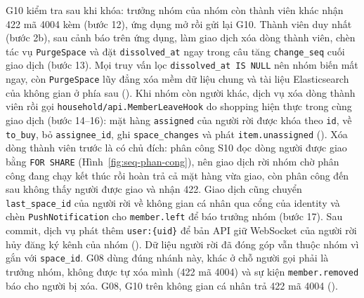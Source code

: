G10 kiểm tra  sau khi khóa: trưởng nhóm của nhóm còn thành viên khác nhận 422 mã 4004 kèm  (bước 12), ứng dụng mở  rồi gửi lại G10. Thành viên duy nhất (bước 2b), sau cảnh báo  trên ứng dụng, làm giao dịch xóa dòng thành viên, chèn tác vụ \texttt{PurgeSpace} và đặt \texttt{dissolved\_at} ngay trong câu tăng \texttt{change\_seq} cuối giao dịch (bước 13). Mọi truy vấn lọc \texttt{dissolved\_at IS NULL} nên nhóm biến mất ngay, còn \texttt{PurgeSpace} lũy đẳng xóa mềm dữ liệu chung và tài liệu Elasticsearch của không gian ở phía sau (). Khi nhóm còn người khác, dịch vụ xóa dòng thành viên rồi gọi \texttt{household/api.MemberLeaveHook} do shopping hiện thực trong cùng giao dịch (bước 14--16): mặt hàng \texttt{assigned} của người rời được khóa theo \texttt{id}, về \texttt{to\_buy}, bỏ \texttt{assignee\_id}, ghi \texttt{space\_changes} và phát \texttt{item.unassigned} (). Xóa dòng thành viên trước là có chủ đích: phân công S10 đọc dòng người được giao bằng \texttt{FOR SHARE} (Hình~\ref{fig:seq-phan-cong}), nên giao dịch rời nhóm chờ phân công đang chạy kết thúc rồi hoàn trả cả mặt hàng vừa giao, còn phân công đến sau không thấy người được giao và nhận 422. Giao dịch cũng chuyển \texttt{last\_space\_id} của người rời về không gian cá nhân qua cổng của identity và chèn \texttt{PushNotification} cho \texttt{member.left} để báo trưởng nhóm (bước 17). Sau commit, dịch vụ phát thêm \texttt{user:\{uid\}} để bản API giữ WebSocket của người rời hủy đăng ký kênh của nhóm (). Dữ liệu người rời đã đóng góp vẫn thuộc nhóm vì gắn với \texttt{space\_id}. G08 dùng đúng nhánh này, khác ở chỗ người gọi phải là trưởng nhóm, không được tự xóa mình (422 mã 4004) và sự kiện \texttt{member.removed} báo cho người bị xóa. G08, G10 trên không gian cá nhân trả 422 mã 4004 ().

